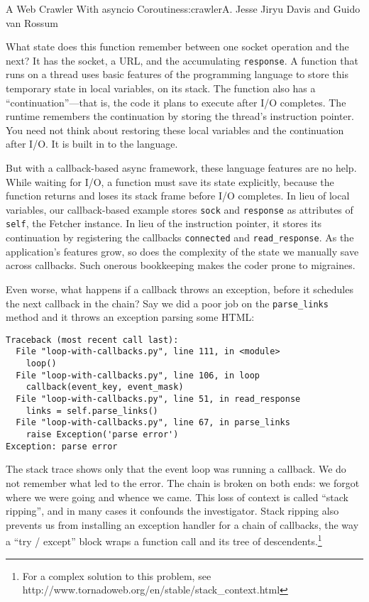 \begin{aosachapter}{A Web Crawler With asyncio Coroutines}{s:crawler}{A. Jesse Jiryu Davis and Guido van Rossum}
\begin{Shaded}
\begin{Highlighting}[]
\end{Highlighting}
\end{Shaded}

What state does this function remember between one socket operation and
the next? It has the socket, a URL, and the accumulating
\texttt{response}. A function that runs on a thread uses basic features
of the programming language to store this temporary state in local
variables, on its stack. The function also has a ``continuation''---that
is, the code it plans to execute after I/O completes. The runtime
remembers the continuation by storing the thread's instruction pointer.
You need not think about restoring these local variables and the
continuation after I/O. It is built in to the language.

But with a callback-based async framework, these language features are
no help. While waiting for I/O, a function must save its state
explicitly, because the function returns and loses its stack frame
before I/O completes. In lieu of local variables, our callback-based
example stores \texttt{sock} and \texttt{response} as attributes of
\texttt{self}, the Fetcher instance. In lieu of the instruction pointer,
it stores its continuation by registering the callbacks
\texttt{connected} and \texttt{read\_response}. As the application's
features grow, so does the complexity of the state we manually save
across callbacks. Such onerous bookkeeping makes the coder prone to
migraines.

Even worse, what happens if a callback throws an exception, before it
schedules the next callback in the chain? Say we did a poor job on the
\texttt{parse\_links} method and it throws an exception parsing some
HTML:

\begin{verbatim}
Traceback (most recent call last):
  File "loop-with-callbacks.py", line 111, in <module>
    loop()
  File "loop-with-callbacks.py", line 106, in loop
    callback(event_key, event_mask)
  File "loop-with-callbacks.py", line 51, in read_response
    links = self.parse_links()
  File "loop-with-callbacks.py", line 67, in parse_links
    raise Exception('parse error')
Exception: parse error
\end{verbatim}

The stack trace shows only that the event loop was running a callback.
We do not remember what led to the error. The chain is broken on both
ends: we forgot where we were going and whence we came. This loss of
context is called ``stack ripping'', and in many cases it confounds the
investigator. Stack ripping also prevents us from installing an
exception handler for a chain of callbacks, the way a ``try / except''
block wraps a function call and its tree of descendents.\footnote{For a
  complex solution to this problem, see
  http://www.tornadoweb.org/en/stable/stack\_context.html}


\end{aosachapter}
